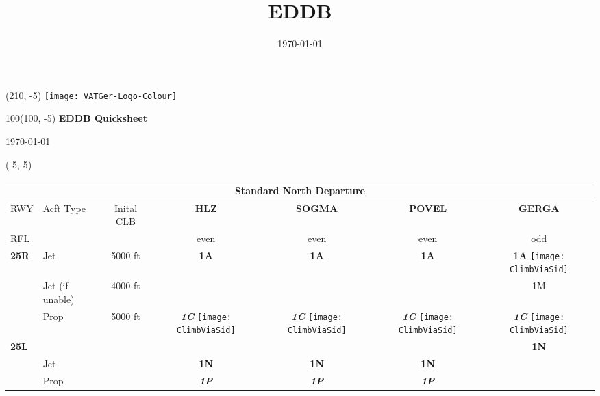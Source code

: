 \documentclass[10pt,landscape,a4paper]{article}
\title{EDDB}
\author{ }
\date{\today}
\begin{document}
\setlength\extrarowheight{1pt}

\setlength{\TPHorizModule}{1mm}
\setlength{\TPVertModule}{\TPHorizModule}
\textblockorigin{7mm}{12mm}

\begin{textblock}{2}(210, -5)
  \texttt{[image: VATGer-Logo-Colour]}
\end{textblock}

\begin{textblock}{100}(100, -5)
  \large
  \centering
  \textbf{EDDB Quicksheet}

  \today
\end{textblock}


\begin{textblock}{30}(-5,-5)
\begin{table}
\begin{tabular}{|l|l|c|c|c|c|c|}
\multicolumn{7}{c}{\textbf{Standard North Departure}}  \\ \hline
RWY 			& Acft Type				& Inital CLB & \textbf{HLZ} & \textbf{SOGMA} & \textbf{POVEL} & \textbf{GERGA} \\
RFL 			& 						& 			& even & even & even & odd \\		\hline	

\textbf{25R} & Jet & 5000 ft & \textbf{1A} & \textbf{1A} & \textbf{1A} & \textbf{1A} \texttt{[image: ClimbViaSid]}  \\ \cline{2-7}
& Jet (if unable) & 4000 ft & & & & 1M \\ \cline{2-7}
& Prop & \multirow{6}{*}{5000 ft} & \textbf{\textit{1C}} \texttt{[image: ClimbViaSid]} & \textbf{\textit{1C}} \texttt{[image: ClimbViaSid]} & \textbf{\textit{1C}}  \texttt{[image: ClimbViaSid]} & \textbf{\textit{1C}} \texttt{[image: ClimbViaSid]} \\ \cline{1-2} \cline{4-7}

\textbf{25L} & & & & & & \textbf{1N} \\ \cline{2-2} \cline{4-7}
& Jet & & \textbf{1N} & \textbf{1N} & \textbf{1N} & \\ \cline{2-2} \cline{4-7}
& Prop & & \textbf{\textit{1P}} & \textbf{\textit{1P}} & \textbf{\textit{1P}} & \\ \cline{1-2} \cline{4-7}


\end{tabular}
\end{table}
\end{textblock}
\end{document}
